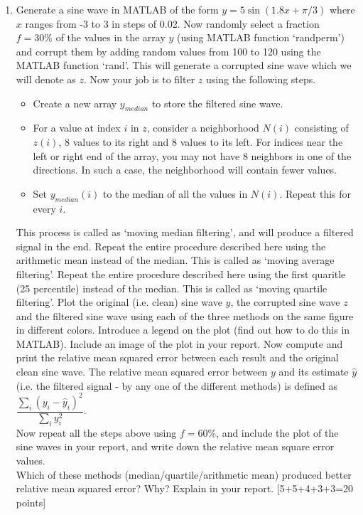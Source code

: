 \documentclass[11pt]{article}
\begin{document}
\begin{enumerate}
\item Generate a sine wave in MATLAB of the form $y = 5 \sin (1.8x + \pi/3)$ where $x$ ranges from -3 to 3 in steps of 0.02. Now randomly select a fraction $f = 30\%$ of the values in the array $y$ (using MATLAB function `randperm') and corrupt them by adding random values from 100 to 120 using the MATLAB function `rand'. This will generate a corrupted sine wave which we will denote as $z$. Now your job is to filter $z$ using the following steps. 
\begin{itemize}
\item Create a new array $y_{median}$ to store the filtered sine wave.
\item For a value at index $i$ in $z$, consider a neighborhood $N(i)$ consisting of $z(i)$, 8 values to its right and 8 values to its left. For indices near the left or right end of the array, you may not have 8 neighbors in one of the directions. In such a case, the neighborhood will contain fewer values.
\item Set $y_{median}(i)$ to the median of all the values in $N(i)$. Repeat this for every $i$. 
\end{itemize}
This process is called as `moving median filtering', and will produce a filtered signal in the end. Repeat the entire procedure described here using the arithmetic mean instead of the median. This is called as `moving average filtering'. Repeat the entire procedure described here using the first quaritle (25 percentile) instead of the median. This is called as `moving quartile filtering'. Plot the original (i.e. clean) sine wave $y$, the corrupted sine wave $z$ and the filtered sine wave using each of the three methods on the same figure in different colors. Introduce a legend on the plot (find out how to do this in MATLAB). Include an image of the plot in your report. Now compute and print the relative mean squared error between each result and the original clean sine wave. The relative mean squared error between $y$ and its estimate $\hat{y}$ (i.e. the filtered signal - by any one of the different methods) is defined as $\dfrac{\sum_i (y_i-\hat{y}_i)^2}{\sum_i y^2_i}$. \\
Now repeat all the steps above using $f = 60\%$, and include the plot of the sine waves in your report, and write down the relative mean square error values. \\
Which of these methods (median/quartile/arithmetic mean) produced better relative mean squared error? Why? Explain in your report. \textsf{[5+5+4+3+3=20 points]}


\end{enumerate}
\end{document}
